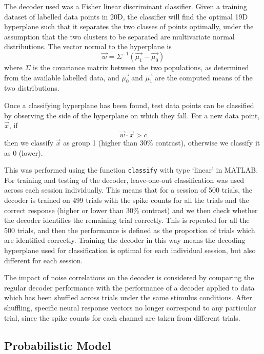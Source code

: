 The decoder used was a Fisher linear discriminant classifier.
Given a training dataset of labelled data points in 20D, the classifier will find the optimal 19D hyperplane such that it separates the two classes of points optimally, under the assumption that the two clusters to be separated are multivariate normal distributions.
The vector normal to the hyperplane is 
\begin{equation}
\vec{w} = \Sigma^{-1}\left(\vec{\mu_1}-\vec{\mu_0}\right)
\end{equation}
where $\Sigma$ is the covariance matrix between the two populations, as determined from the available labelled data, and $\vec{\mu_0}$ and $\vec{\mu_1}$ are the computed means of the two distributions.

Once a classifying hyperplane has been found, test data points can be classified by observing the side of the hyperplane on which they fall.
For a new data point, $\vec{x}$,  if
\begin{equation}
\vec{w}\cdot\vec{x}>c
\end{equation}
then we classify $\vec{x}$ as group 1 (higher than 30\% contrast), otherwise we classify it as 0 (lower).

This was performed using the function \texttt{classify} with type `linear' in MATLAB.
For training and testing of the decoder, leave-one-out classification was used across each session individually.
This means that for a session of 500 trials, the decoder is trained on 499 trials with the spike counts for all the trials and the correct response (higher or lower than 30\% contrast) and we then check whether the decoder identifies the remaining trial correctly.
This is repeated for all the 500 trials, and then the performance is defined as the proportion of trials which are identified correctly.
Training the decoder in this way means the decoding hyperplane used for classification is optimal for each individual session, but also different for each session.

The impact of noise correlations on the decoder is considered by comparing the regular decoder performance with the performance of a decoder applied to data which has been shuffled across trials under the same stimulus conditions.
After shuffling, specific neural response vectors no longer correspond to any particular trial, since the spike counts for each channel are taken from different trials.

\subsection{Probabilistic Model}
\label{sec:dec-meth-prob}

